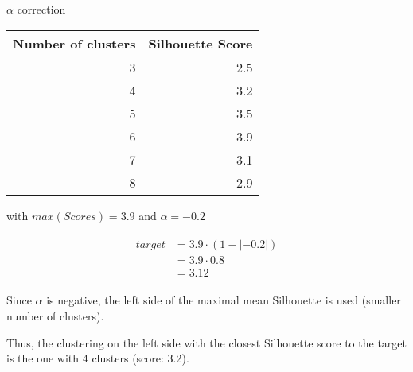 \begin{example}
  \centering
  \caption{$\alpha$ correction}
  \label{ex:alpha_correction}

  \begin{tabular}{r r}
    \toprule
    Number of clusters & Silhouette Score \\
    \midrule
    3 & 2.5 \\
    4 & 3.2 \\
    5 & 3.5 \\
    6 & 3.9 \\
    7 & 3.1 \\
    8 & 2.9 \\
    \bottomrule
  \end{tabular}

  \vspace{0.5cm}

  \raggedright
  with $max(Scores) = 3.9$ and $\alpha = -0.2$

  \begin{gather*}
    \begin{aligned}
    target &= 3.9 \cdot (1 - |-0.2|) \\
           &= 3.9 \cdot 0.8 \\
           &= 3.12
     \end{aligned}
   \end{gather*}

  \vspace{0.5cm}

  Since $\alpha$ is negative, the left side of the maximal mean Silhouette is used (smaller number of clusters).

  Thus, the clustering on the left side with the closest Silhouette score to the target is the one with 4 clusters (score: 3.2).
\end{example}

\begin{table}
  \centering
  \caption{Silhouette-based clustering evaluation ($\alpha = -0.2$), mean $B^3_{F_1}$/$r_{diff}$}
  \label{tab:silhouette-based_clustering_alpha}

\end{table}
